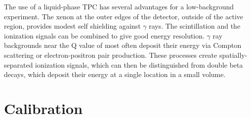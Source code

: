 \documentclass[herrin-thesis.tex]{subfiles}
\begin{document}
The use of a liquid-phase TPC has several advantages for a low-background experiment. The xenon at the outer edges of the detector, outside of the active region, provides modest self shielding against \(\gamma\) rays. The scintillation and the ionization signals can be combined to give good energy resolution\cite{Conti:2003tg}\cite{Aprile:2007hc}. \(\gamma\) ray backgrounds near the Q value of  most often deposit their energy via Compton scattering or electron-positron pair production. These processes create spatially-separated ionization signals, which can then be distinguished from double beta decays, which deposit their energy at a single location in a small volume.

\section{Calibration}
\end{document}
